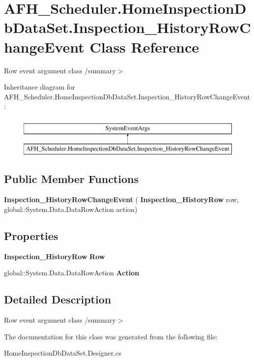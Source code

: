 \section{A\+F\+H\+\_\+\+Scheduler.\+Home\+Inspection\+Db\+Data\+Set.\+Inspection\+\_\+\+History\+Row\+Change\+Event Class Reference}
\label{class_a_f_h___scheduler_1_1_home_inspection_db_data_set_1_1_inspection___history_row_change_event}


Row event argument class /summary$>$  


Inheritance diagram for A\+F\+H\+\_\+\+Scheduler.\+Home\+Inspection\+Db\+Data\+Set.\+Inspection\+\_\+\+History\+Row\+Change\+Event\+:\begin{figure}[H]
\begin{center}
\leavevmode
\includegraphics[height=2.000000cm]{class_a_f_h___scheduler_1_1_home_inspection_db_data_set_1_1_inspection___history_row_change_event}
\end{center}
\end{figure}
\subsection*{Public Member Functions}
\begin{DoxyCompactItemize}
\item 
\mbox{\label{class_a_f_h___scheduler_1_1_home_inspection_db_data_set_1_1_inspection___history_row_change_event_ac807f94604f34417410b8af102ee1858}} 
{\bfseries Inspection\+\_\+\+History\+Row\+Change\+Event} (\textbf{ Inspection\+\_\+\+History\+Row} row, global\+::\+System.\+Data.\+Data\+Row\+Action action)
\end{DoxyCompactItemize}
\subsection*{Properties}
\begin{DoxyCompactItemize}
\item 
\mbox{\label{class_a_f_h___scheduler_1_1_home_inspection_db_data_set_1_1_inspection___history_row_change_event_add188c25f9580c72ecb5af1d05aaf337}} 
\textbf{ Inspection\+\_\+\+History\+Row} {\bfseries Row}\hspace{0.3cm}{\ttfamily  [get]}
\item 
\mbox{\label{class_a_f_h___scheduler_1_1_home_inspection_db_data_set_1_1_inspection___history_row_change_event_aa1e48beaff32ec9f5ee04dfc8b9737ef}} 
global\+::\+System.\+Data.\+Data\+Row\+Action {\bfseries Action}\hspace{0.3cm}{\ttfamily  [get]}
\end{DoxyCompactItemize}


\subsection{Detailed Description}
Row event argument class /summary$>$ 

The documentation for this class was generated from the following file\+:\begin{DoxyCompactItemize}
\item 
Home\+Inspection\+Db\+Data\+Set.\+Designer.\+cs\end{DoxyCompactItemize}

